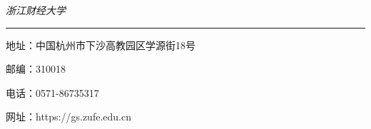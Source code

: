 
\clearpage
\thispagestyle{empty}
\setlength{\parskip}{0pt}
\vspace*{163mm}

{\setlength{\parindent}{17mm}%
 \mystsong\itshape{}%
 浙\hspace{\ccwd}江\hspace{\ccwd}财\hspace{\ccwd}经\hspace{\ccwd}大\hspace{\ccwd}学\par}

\vspace{2mm}
\noindent\rule{\textwidth}{0.4pt}

\vspace{5mm}

{\setlength{\parindent}{5mm}%
 \mystkaiti{}%
 地\hspace{0.5em}址：中国杭州市下沙高教园区学源街18号\par
 邮\hspace{0.5em}编：310018\par
 电\hspace{0.5em}话：0571-86735317\par
 网\hspace{0.5em}址：https://gs.zufe.edu.cn\par}
